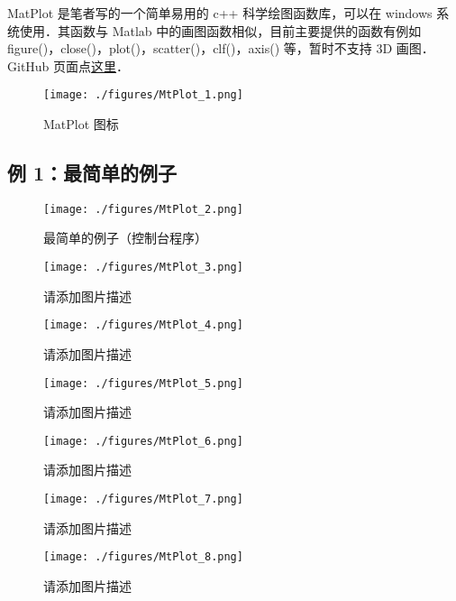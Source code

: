 
MatPlot 是笔者写的一个简单易用的 c++ 科学绘图函数库，可以在 windows 系统使用．其函数与 Matlab 中的画图函数相似，目前主要提供的函数有例如 figure()，close()，plot()，scatter()，clf()，axis() 等，暂时不支持 3D 画图． GitHub 页面点\href{https://github.com/MacroUniverse/MatPlot}{这里}．

\begin{figure}[ht]
\centering
\texttt{[image: ./figures/MtPlot\_1.png]}
\caption{MatPlot 图标} \label{MtPlot_fig1}
\end{figure}

\subsection{例 1：最简单的例子}


\begin{figure}[ht]
\centering
\texttt{[image: ./figures/MtPlot\_2.png]}
\caption{最简单的例子（控制台程序）} \label{MtPlot_fig2}
\end{figure}

\begin{figure}[ht]
\centering
\texttt{[image: ./figures/MtPlot\_3.png]}
\caption{请添加图片描述} \label{MtPlot_fig3}
\end{figure}

\begin{figure}[ht]
\centering
\texttt{[image: ./figures/MtPlot\_4.png]}
\caption{请添加图片描述} \label{MtPlot_fig4}
\end{figure}

\begin{figure}[ht]
\centering
\texttt{[image: ./figures/MtPlot\_5.png]}
\caption{请添加图片描述} \label{MtPlot_fig5}
\end{figure}

\begin{figure}[ht]
\centering
\texttt{[image: ./figures/MtPlot\_6.png]}
\caption{请添加图片描述} \label{MtPlot_fig6}
\end{figure}

\begin{figure}[ht]
\centering
\texttt{[image: ./figures/MtPlot\_7.png]}
\caption{请添加图片描述} \label{MtPlot_fig7}
\end{figure}

\begin{figure}[ht]
\centering
\texttt{[image: ./figures/MtPlot\_8.png]}
\caption{请添加图片描述} \label{MtPlot_fig8}
\end{figure}